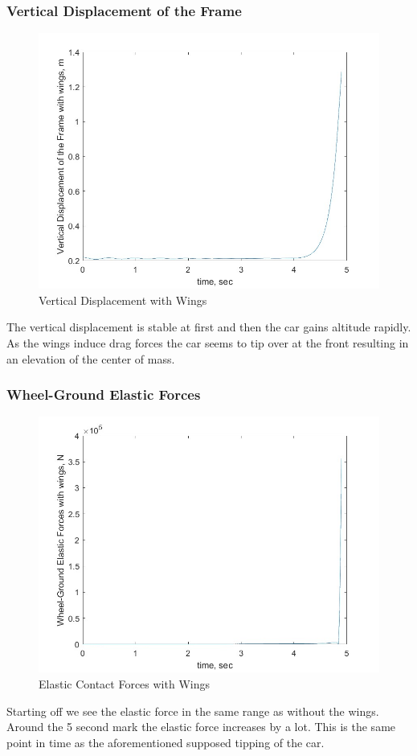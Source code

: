 \subsubsection{Vertical Displacement of the Frame}
\begin{figure}[ht]
    \centering
    \includegraphics[scale=0.4]{images/vertical_displacement_wings.jpg}
    \caption{Vertical Displacement with Wings}
    \label{fig:vertical_wings}
\end{figure}
The vertical displacement is stable at first and then the car gains altitude rapidly. As the wings induce drag forces the car seems to tip over at the front resulting in an elevation of the center of mass.
\clearpage %
\subsubsection{Wheel-Ground Elastic Forces}
\begin{figure}[ht]
    \centering
    \includegraphics[scale=0.4]{images/wheel-ground_elastic_forces_wings.jpg}
    \caption{Elastic Contact Forces with Wings}
    \label{fig:elastic_forces_wings}
\end{figure}
Starting off we see the elastic force in the same range as without the wings. Around the 5 second mark the elastic force increases by a lot. This is the same point in time as the aforementioned supposed tipping of the car.
\clearpage %
